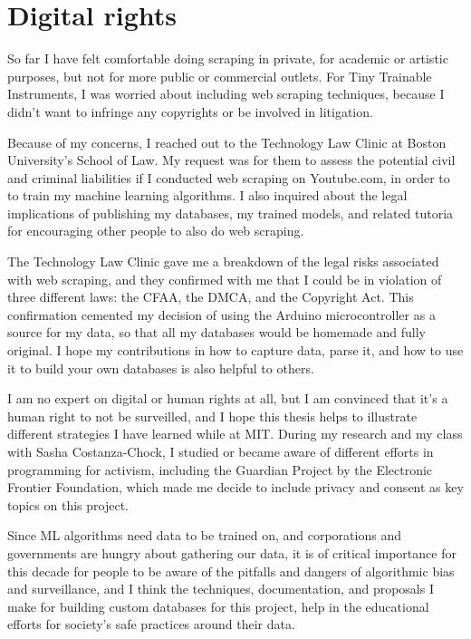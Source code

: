 \section{Digital rights}


So far I have felt comfortable doing scraping in private, for academic or artistic purposes, but not for more public or commercial outlets. For Tiny Trainable Instruments, I was worried about including web scraping techniques, because I didn't want to infringe any copyrights or be involved in litigation.

Because of my concerns, I reached out to the Technology Law Clinic \cite{website-boston-university-technology-law-clinic} at Boston University's School of Law. My request was for them to assess the potential civil and criminal liabilities if I conducted web scraping on Youtube.com, in order to to train my machine learning algorithms. I also inquired about the legal implications of publishing my databases, my trained models, and related tutoria for encouraging other people to also do web scraping.

The Technology Law Clinic gave me a breakdown of the legal risks associated with web scraping, and they confirmed with me that I could be in violation of three different laws: the \acrfull{CFAA}, the \acrfull{DMCA}, and the Copyright Act. This confirmation cemented my decision of using the Arduino microcontroller as a source for my data, so that all my databases would be homemade and fully original. I hope my contributions in how to capture data, parse it, and how to use it to build your own databases is also helpful to others.

I am no expert on digital or human rights at all, but I am convinced that it's a human right to not be surveilled, and I hope this thesis helps to illustrate different strategies I have learned while at MIT. During my research and my class with Sasha Costanza-Chock, I studied or became aware of different efforts in programming for activism, including the Guardian Project by the Electronic Frontier Foundation, which made me decide to include privacy and consent as key topics on this project.

Since \acrshort{ML} algorithms need data to be trained on, and corporations and governments are hungry about gathering our data, it is of critical importance for this decade for people to be aware of the pitfalls and dangers of algorithmic bias and surveillance, and I think the techniques, documentation, and proposals I make for building custom databases for this project, help in the educational efforts for society's safe practices around their data.

